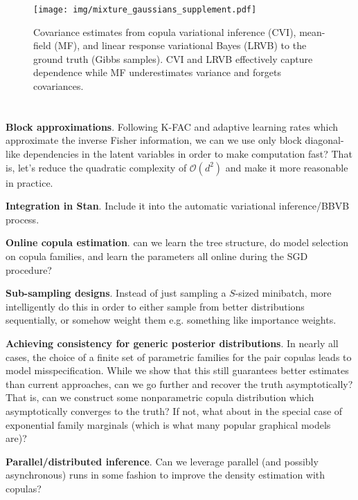 \begin{figure}[t]
  \centering
  \texttt{[image: img/mixture\_gaussians\_supplement.pdf]}
  \caption{\label{fig:lrvb}Covariance estimates from
  copula variational inference (\gls{CVI}), mean-field (\gls{MF}), and
  linear response variational Bayes (\gls{LRVB}) to the ground truth
  (Gibbs samples). \gls{CVI} and \gls{LRVB} effectively capture dependence
  while \gls{MF} underestimates variance and forgets covariances.}
\end{figure}


\section{}
\label{sec:future}
\textbf{Block approximations}. Following K-FAC and adaptive learning rates
which approximate the inverse Fisher information, we can we use only block
diagonal-like dependencies in the latent variables in order to make computation
fast? That is, let's reduce the quadratic complexity of $\mathcal{O}(d^2)$ and
make it more reasonable in practice.

\textbf{Integration in Stan}. Include it into the automatic variational
inference/BBVB process.

\textbf{Online copula estimation}. can we learn the tree structure, do model
selection on copula families, and learn the parameters all online during the SGD
procedure?

\textbf{Sub-sampling designs}. Instead of just sampling a $S$-sized
minibatch, more intelligently do this in order to either sample from better
distributions sequentially, or somehow weight them e.g. something like importance weights.

\textbf{Achieving consistency for generic posterior distributions}.
In nearly all cases, the choice of a finite set of parametric families for the
pair copulas leads to model misspecification.  While we show that this still
guarantees better estimates than current approaches, can we go further and
recover the truth asymptotically? That is, can we construct some nonparametric
copula distribution which asymptotically converges to the truth? If not, what
about in the special case of exponential family marginals (which is what many
popular graphical models are)?

\textbf{Parallel/distributed inference}. Can we leverage parallel (and
possibly asynchronous) runs in some fashion to improve the density estimation
with copulas?

